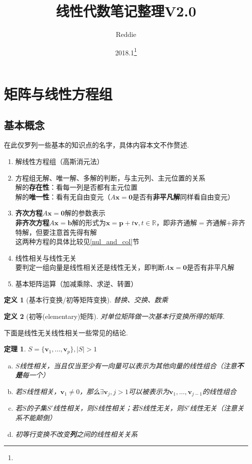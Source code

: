 \documentclass[11pt,UTF8]{ctexart}
\title{线性代数笔记整理V2.0}
\author{Reddie}
\date{2018.1\protect\footnote{\text{Build 201801280000}}}
\newtheorem{theorem}{定理}
\newtheorem{definition}{定义}
\def\vx{\mathbf{x}}
\newcommand{\vb}[1]{\mathbf{#1}}
\renewcommand{\thefootnote}{\fnsymbol{footnote}}
\begin{document}
\maketitle


\setcounter{tocdepth}{2}%
\tableofcontents

\renewcommand{\thefootnote}{\arabic{footnote}}
\setcounter{footnote}{0}

\section{矩阵与线性方程组}
\subsection{基本概念}
在此仅罗列一些基本的知识点的名字，具体内容本文不作赘述.
\begin{enumerate}
	\itemsep -3pt
	\item 解线性方程组（高斯消元法）
	\item 方程组无解、唯一解、多解的判断，与主元列、主元位置的关系\\
		解的\textbf{存在性}：看每一列是否都有主元位置\\
		解的\textbf{唯一性}：看有无自由变元（$A\vx=\vb{0}$是否有\textbf{非平凡解}同样看自由变元）
	\item \textbf{齐次方程}$A\vx=\vb{0}$解的参数表示\\
		\textbf{非齐次方程}$A\vx=\vb{b}$解的形式为$\vx=\vb{p}+t\vb{v},t\in\mathbb{R}$，即非齐通解$=$齐通解$+$非齐特解，但要注意首先得有解\\
		这两种方程的具体比较见\ref{nul_and_col}节
	\item 线性相关与线性无关\\
	要判定一组向量是线性相关还是线性无关，即判断$A\vx=\vb{0}$是否有非平凡解
	\item 基本矩阵运算（加减乘除、求逆、转置）
\end{enumerate}
\begin{definition}[基本行变换/初等矩阵变换]
替换、交换、数乘
\end{definition}
\begin{definition}[初等(elementary)矩阵]
对单位矩阵做一次基本行变换所得的矩阵.
\end{definition}
\par 下面是线性无关线性相关一些常见的结论.
\begin{theorem}
\label{linear_relationship}
$S=\{\vb{v}_1,\dots,\vb{v}_p\},|S|>1$
\begin{enumerate}[(a)]
	\itemsep -3pt
	\item $S$线性相关，当且仅当至少有一向量可以表示为其他向量的线性组合（注意\textbf{不是}每一个）
	\item 若$S$线性相关，$\vb{v}_1\ne 0$，那么$\exists\vb{v}_j,j>1$可以被表示为$\vb{v}_1,\dots,\vb{v}_{j-1}$的线性组合
	\item 若$S$的子集$S'$线性相关，则$S$线性相关；若$S$线性无关，则$S'$线性无关（注意关系不能颠倒）
	\item 初等行变换不改变\textbf{列}之间的线性相关关系
\end{enumerate}
\end{theorem}
\end{document}
